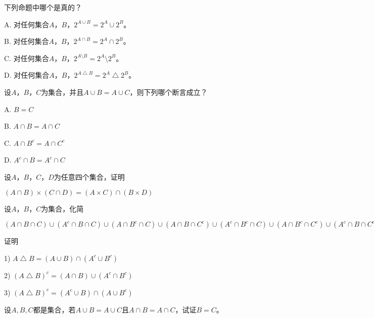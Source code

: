   \begin{Exercise}
下列命题中哪个是真的？

A. 对任何集合$A$，$B$，$2^{A\cup B} = 2^A \cup 2^B$。

B. 对任何集合$A$，$B$，$2^{A\cap B} = 2^A \cap 2^B$。

C. 对任何集合$A$，$B$，$2^{A\setminus B} = 2^A \setminus 2^B$。

D. 对任何集合$A$，$B$，$2^{A\bigtriangleup B} = 2^A \bigtriangleup 2^B$。
  \end{Exercise}
  \begin{Exercise}
    设$A$，$B$，$C$为集合，并且$A\cup B = A \cup C$，则下列哪个断言成立？

    A. $B = C$

    B. $A \cap B = A \cap C$

    C. $A \cap B^c = A \cap C^c$

    D. $A^c \cap B = A^c \cap C$
  \end{Exercise}
  \begin{Exercise}
    设$A$，$B$，$C$，$D$为任意四个集合，证明

    $(A \cap B) \times (C \cap D) =
    (A\times C) \cap (B \times D)$
  \end{Exercise}
  \begin{Exercise}
   设$A$，$B$，$C$为集合，化简

$(A \cap B \cap C)\cup (A^c \cap B \cap C) \cup (A \cap B^c \cap C) \cup (A \cap B \cap C^c) \cup (A^c \cap B^c \cap C) \cup (A \cap B^c \cap C^c) \cup (A^c \cap B \cap C^c)$
  \end{Exercise}
  \begin{Exercise}
   证明

1) $A\bigtriangleup B = (A\cup B) \cap (A^c \cup B^c)$

2) $(A \bigtriangleup B)^c = (A \cap B) \cup (A^c \cap B^c)$

3) $(A \bigtriangleup B)^c = (A^c \cup B) \cap (A \cup B^c)$
\end{Exercise}
\begin{Exercise}
  设$A,B,C$都是集合，若$A\cup B = A\cup C$且$A\cap B = A\cap C$，试证$B=C$。
\end{Exercise}

